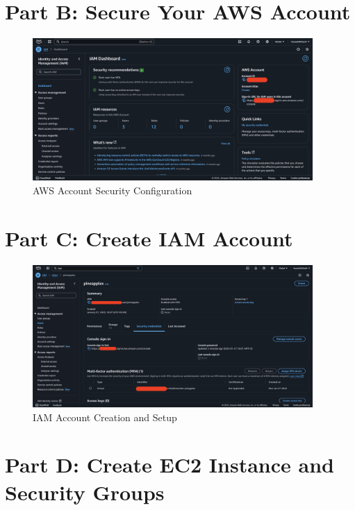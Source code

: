 \documentclass[a4paper,12pt]{article}
\begin{document}
\newpage

\section{Part B: Secure Your AWS Account}

\begin{figure}[H]
    \centering
    \includegraphics[width=0.95\textwidth]{secure-your-account.png}
    \caption{AWS Account Security Configuration}
    \label{fig:secure-account}
\end{figure}

\newpage

\section{Part C: Create IAM Account}

\begin{figure}[H]
    \centering
    \includegraphics[width=0.95\textwidth]{iam-account.png}
    \caption{IAM Account Creation and Setup}
    \label{fig:iam-account}
\end{figure}

\newpage

\section{Part D: Create EC2 Instance and Security Groups}
\end{document}
